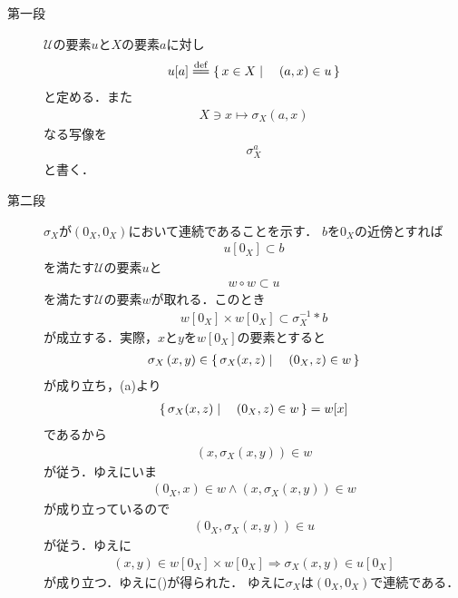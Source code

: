 	\begin{sketch}\mbox{}
		\begin{description}
			\item[第一段] $\mathscr{U}$の要素$u$と$X$の要素$a$に対し
				\begin{align}
					u[a] \defeq \Set{x \in X}{(a,x) \in u}
				\end{align}
				と定める．また
				\begin{align}
					X \ni x \longmapsto \sigma_X(a,x)
				\end{align}
				なる写像を
				\begin{align}
					\sigma_X^a
				\end{align}
				と書く．
				
			\item[第二段]
				$\sigma_X$が$\left(0_X,0_X\right)$において連続であることを示す．
				$b$を$0_X$の近傍とすれば
				\begin{align}
					u[0_X] \subset b
				\end{align}
				を満たす$\mathscr{U}$の要素$u$と
				\begin{align}
					w \circ w \subset u
				\end{align}
				を満たす$\mathscr{U}$の要素$w$が取れる．このとき
				\begin{align}
					w[0_X] \times w[0_X] \subset \sigma_X^{-1} \ast b
					\label{fom:thm_entourages_introducing_vector_topology_1}
				\end{align}
				が成立する．実際，$x$と$y$を$w[0_X]$の要素とすると
				\begin{align}
					\sigma_X\left(x,y\right) \in \left\{\, \sigma_X(x,z) \mid \quad (0_X,z) \in w\, \right\}
				\end{align}
				が成り立ち，(a)より
				\begin{align}
					\left\{\, \sigma_X(x,z) \mid \quad (0_X,z) \in w\, \right\} = w[x]
				\end{align}
				であるから
				\begin{align}
					\left(x,\sigma_X\left(x,y\right)\right) \in w
				\end{align}
				が従う．ゆえにいま
				\begin{align}
					(0_X,x) \in w \wedge \left(x,\sigma_X\left(x,y\right)\right) \in w
				\end{align}
				が成り立っているので
				\begin{align}
					\left(0_X,\sigma_X\left(x,y\right)\right) \in u
				\end{align}
				が従う．ゆえに
				\begin{align}
					\left(x,y\right) \in w[0_X] \times w[0_X] \Longrightarrow
					\sigma_X\left(x,y\right) \in u[0_X]
				\end{align}
				が成り立つ．ゆえに()が得られた．
				ゆえに$\sigma_X$は$\left(0_X,0_X\right)$で連続である．
				

\end{description}
\end{sketch}
